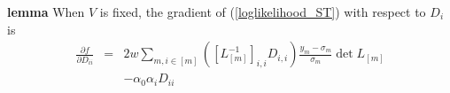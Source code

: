 
\noindent
\textbf{lemma} When $V$ is fixed, the gradient of (\ref{loglikelihood_ST}) with respect to $D_i$ is
\begin{eqnarray}
\label{ST_Dgradient}
\frac{\partial f}{\partial D_{ii}} & = & 2 w \sum_{m, i \in [m]} ([L_{[m]}^{-1}]_{i,i} D_{i,i}) \frac{y_m-\sigma_m}{\sigma_m} \det L_{[m]} \\
& & - \alpha_0 \alpha_i D_{ii} \nonumber
\end{eqnarray}


